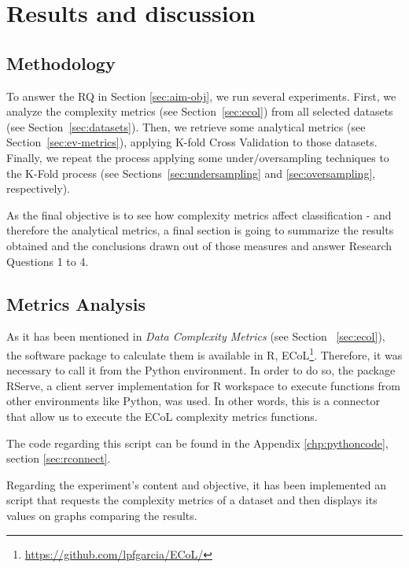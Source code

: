 \section{Results and discussion}


\subsection{Methodology}

To answer the RQ in Section \ref{sec:aim-obj}, we run several experiments.
First, we analyze the complexity metrics (see Section~\ref{sec:ecol}) from all 
selected datasets (see Section~\ref{sec:datasets}). Then, we retrieve some
analytical metrics (see Section~\ref{sec:ev-metrics}), applying K-fold Cross
Validation to those datasets. Finally, we repeat the process applying some 
under/oversampling techniques to the K-Fold process (see 
Sections~\ref{sec:undersampling} and \ref{sec:oversampling}, respectively).

As the final objective is to see how complexity metrics affect classification -
and therefore the analytical metrics, a final section is going to summarize
the results obtained and the conclusions drawn out of those measures and answer
Research Questions 1 to 4.

\subsection{Metrics Analysis}

As it has been mentioned in \textit{Data Complexity Metrics} (see 
Section ~\ref{sec:ecol}), the software package to calculate them is 
available in R, ECoL\footnote{\url{https://github.com/lpfgarcia/ECoL/}}. 
Therefore, it was  necessary to call it from the Python environment. 
In order to do so, the package RServe, a client server implementation 
for R workspace to execute functions from other environments like 
Python, was used. In other words, this is a connector that allow us 
to execute the ECoL complexity metrics functions.

The code regarding this script can be found in the Appendix 
\ref{chp:pythoncode}, section \ref{sec:rconnect}.

Regarding the experiment's content and objective, it has been 
implemented an script that requests the complexity metrics of a 
dataset and then displays its values on graphs comparing the results. 

